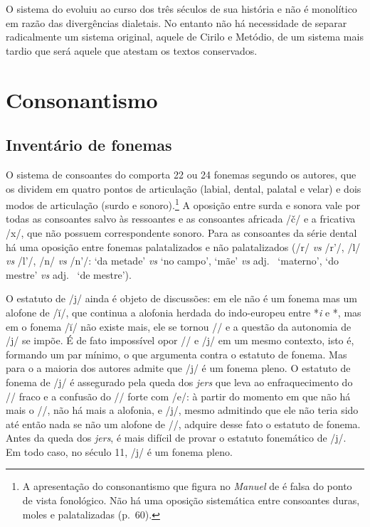 
O sistema do  evoluiu ao curso dos três séculos de sua
história e não é monolítico em razão das divergências dialetais.
No entanto não há necessidade de separar radicalmente um sistema original,
aquele de Cirilo e Metódio, de um sistema mais tardio que será aquele que
atestam os textos conservados.

\section{Consonantismo}

\subsection{Inventário de fonemas}\label{sec:invcons}



O sistema de consoantes do  comporta 22 ou 24 fonemas segundo os
autores, que os dividem em quatro pontos de articulação (labial, dental,
palatal e velar) e dois modos de articulação (surdo e sonoro).\footnote{%
	A apresentação do consonantismo que figura no \emph{Manuel} de
	\textcite[57]{Vaillant1964} é falsa do ponto de vista fonológico. Não há uma
	oposição sistemática entre consoantes duras, moles e palatalizadas (p.~60).
}
A oposição entre surda e sonora vale por todas as consoantes salvo às
ressoantes e as consoantes africada /č/ e a fricativa /x/, que não possuem
correspondente sonoro.
Para as consoantes da série dental há uma oposição entre fonemas palatalizados
e não palatalizados (/r/ \emph{vs} /r'/, /l/ \emph{vs} /l'/, /n/ \emph{vs}
/n'/:   `da metade'
\emph{vs}   `no
campo', 
 `mãe' \emph{vs}
adj.~
 `materno',
  `do
mestre' \emph{vs} adj.~
 `de mestre').

O estatuto de /j/ ainda é objeto de discussões: em  ele não é um
fonema mas um alofone de /ĭ/, que continua a alofonia herdada do indo-europeu
entre *\emph{i} e *, mas em  o fonema /ĭ/ não existe
mais, ele se tornou \slash{}\jeri{}/ e a questão da autonomia de /j/ se impõe.
É de fato impossível opor /\jeri{}/ e /j/ em um mesmo contexto, isto é,
formando um par mínimo, o que argumenta contra o estatuto de fonema.
Mas para o  a maioria dos autores admite que /j/ é um fonema pleno.
O estatuto de fonema de /j/ é assegurado pela queda dos \emph{jers} que leva
ao enfraquecimento do /\jeri{}/ fraco e a confusão do /\jeri{}/
forte com /e/: à partir do momento em que não há mais o /\jeri{}/, não há
mais a alofonia, e /j/, mesmo admitindo que ele não teria sido até então nada
se não um alofone de /\jeri{}/, adquire desse fato o estatuto de fonema.
Antes da queda dos \emph{jers}, é mais difícil de provar o estatuto fonemático
de /j/.
Em todo caso, no século 11, /j/ é um fonema pleno.

